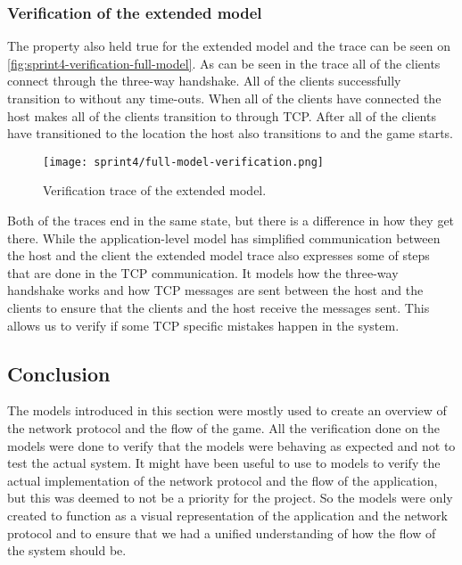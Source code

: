 \subsubsection{Verification of the extended model}
The property also held true for the extended model and the trace can be seen on \autoref{fig:sprint4-verification-full-model}.
As can be seen in the trace all of the clients connect through the three-way handshake.
All of the clients successfully transition to  without any time-outs.
When all of the clients have connected the host makes all of the clients transition to  through TCP.
After all of the clients have transitioned to the  location the host also transitions to  and the game starts.
\begin{figure}[H]
    \centering
    \texttt{[image: sprint4/full-model-verification.png]}
    \caption{Verification trace of the extended model.}
    \label{fig:sprint4-verification-full-model}
\end{figure}
\noindent
Both of the traces end in the same state, but there is a difference in how they get there.
While the application-level model has simplified communication between the host and the client the extended model trace also expresses some of steps that are done in the TCP communication.
It models how the three-way handshake works and how TCP messages are sent between the host and the clients to ensure that the clients and the host receive the messages sent.
This allows us to verify if some TCP specific mistakes happen in the system.

\subsection{Conclusion}
The models introduced in this section were mostly used to create an overview of the network protocol and the flow of the game.
All the verification done on the models were done to verify that the models were behaving as expected and not to test the actual system.
It might have been useful to use to models to verify the actual implementation of the network protocol and the flow of the application, but this was deemed to not be a priority for the project.
So the models were only created to function as a visual representation of the application and the network protocol and to ensure that we had a unified understanding of how the flow of the system should be.
